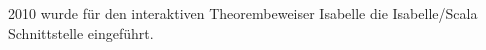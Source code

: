 \section*{\abstractname}

2010 wurde für den interaktiven Theorembeweiser Isabelle die Isabelle/Scala Schnittstelle
eingeführt.\cite{iscala}
